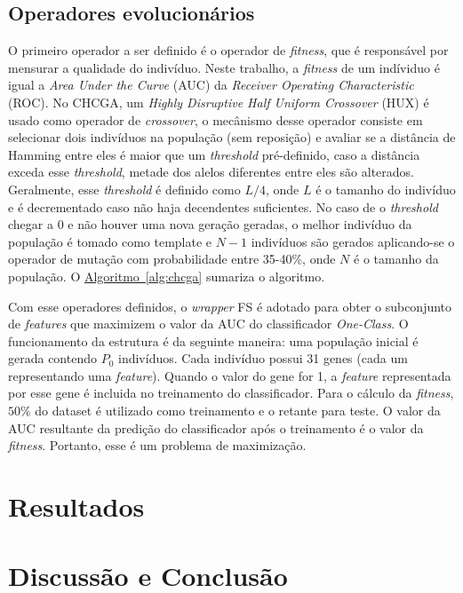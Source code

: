 \documentclass{article}
\begin{document}
\subsection{Operadores evolucionários}
O primeiro operador a ser definido é o operador de \textit{fitness}, que é
responsável por mensurar a qualidade do indivíduo. Neste trabalho, a
\textit{fitness} de um indíviduo é igual a \textit{Area Under the Curve} (AUC)
da \textit{Receiver Operating Characteristic} (ROC). No CHCGA, um \textit{Highly
  Disruptive Half Uniform Crossover} (HUX) é usado como operador de
\textit{crossover}, o mecânismo desse operador consiste em selecionar dois
indivíduos na população (sem reposição) e avaliar se a distância de Hamming
entre eles é maior que um \textit{threshold} pré-definido, caso a distância
exceda esse \textit{threshold}, metade dos alelos diferentes entre eles são
alterados. Geralmente, esse \textit{threshold} é definido como $L/4$, onde $L$ é
o tamanho do indivíduo e é decrementado caso não haja decendentes suficientes.
No caso de o \textit{threshold} chegar a 0 e não houver uma nova geração
geradas, o melhor indivíduo da população é tomado como template e $N-1$
indivíduos são gerados aplicando-se o operador de mutação com probabilidade
entre 35-40\%, onde $N$ é o tamanho da população. O
\hyperref[alg:chcga]{Algoritmo~\ref*{alg:chcga}} sumariza o algoritmo.

Com esse operadores definidos, o \textit{wrapper} FS é adotado para obter o
subconjunto de \textit{features} que maximizem o valor da AUC do classificador
\textit{One-Class}. O funcionamento da estrutura é da seguinte maneira: uma
população inicial é gerada contendo $P_0$ indivíduos. Cada indivíduo possui 31
genes (cada um representando uma \textit{feature}).  Quando o valor do gene for
1, a \textit{feature} representada por esse gene é incluida no treinamento do
classificador. Para o cálculo da \textit{fitness}, $50\%$ do dataset é utilizado
como treinamento e o retante para teste. O valor da AUC resultante da predição
do classificador após o treinamento é o valor da \textit{fitness}. Portanto,
esse é um problema de maximização.

\section{Resultados} \label{sec_resultados}


\section{Discussão e Conclusão} \label{sec_conclusao}

 
\end{document}
